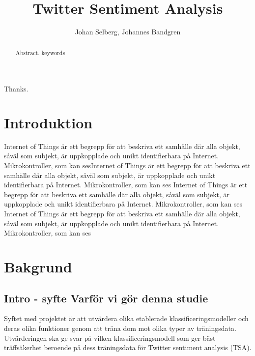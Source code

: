 \documentclass{kaumasters} %
\title{Twitter Sentiment Analysis}
\author{Johan Selberg, Johannes Bandgren}
\institute{Department of Computer Science}
\begin{document}
\maketitle



\frontmatter
\begin{abstract}
  Abstract.
  \keywords keywords
\end{abstract}
\approvalpage%
\begin{acknowledgements}
  Thanks.
\end{acknowledgements}

\tableofcontents{}
\mainmatter


\chapter{Introduktion}
Internet of Things är ett begrepp för att beskriva ett samhälle där alla objekt, såväl som subjekt, är uppkopplade och unikt identifierbara på Internet. Mikrokontroller, som kan sesInternet of Things är ett begrepp för att beskriva ett samhälle där alla objekt, såväl som subjekt, är uppkopplade och unikt identifierbara på Internet. Mikrokontroller, som kan ses
Internet of Things är ett begrepp för att beskriva ett samhälle där alla objekt, såväl som subjekt, är uppkopplade och unikt identifierbara på Internet. Mikrokontroller, som kan ses
Internet of Things är ett begrepp för att beskriva ett samhälle där alla objekt, såväl som subjekt, är uppkopplade och unikt identifierbara på Internet. Mikrokontroller, som kan ses


\chapter{Bakgrund}
\section{Intro - syfte Varför vi gör denna studie}
Syftet med projektet är att utvärdera olika etablerade klassificeringsmodeller och deras olika funktioner genom att träna dom mot olika typer av träningsdata. Utvärderingen ska ge svar på vilken klassificeringsmodell som ger bäst träffsäkerhet beroende på dess träningsdata för Twitter sentiment analysis (TSA).
\end{document}
